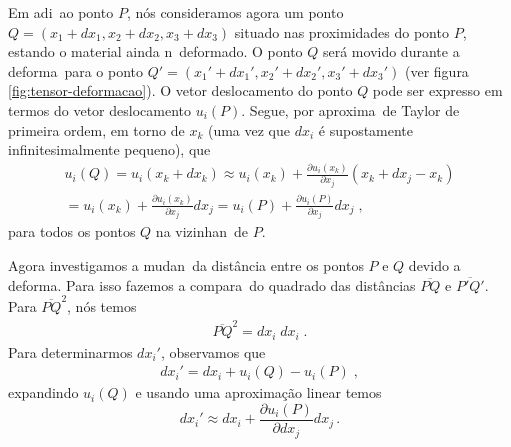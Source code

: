 Em adi\cao\ ao ponto $P$, n\'os consideramos agora um ponto
$Q=(x_1+dx_1,x_2+dx_2,x_3+dx_3)$ situado nas proximidades do
ponto $P$, estando o material ainda n\ao\ deformado. O
ponto $Q$ ser\'a movido durante a deforma\cao\ para o ponto
$Q'=(x_1'+dx_1',x_2'+dx_2',x_3'+dx_3')$ (ver figura \ref{fig:tensor-deformacao}). O vetor
deslocamento do ponto $Q$ pode ser expresso em termos do
vetor deslocamento $u_i(P)$. Segue, por aproxima\cao\ de Taylor de
primeira ordem, em torno de $x_k$ (uma vez que $dx_i$ \'e supostamente infinitesimalmente
pequeno), que
\begin{eqnarray} \label{vdq}
u_i(Q) = u_i(x_k+dx_k) \approx u_i(x_k) +
\frac{\partial u_i(x_k)}
{\partial x_j} (x_k + dx_j - x_k) \nonumber \\
 = u_i(x_k) +\frac{\partial u_i(x_k)}
{\partial x_j} dx_j = u_i(P) + \frac{\partial u_i(P)}
{\partial x_j} dx_j \; ,
\end{eqnarray}
para todos os pontos $Q$ na vizinhan\ca\ de $P$.


Agora investigamos a mudan\ca\ da dist\^ancia entre os pontos
$P$ e $Q$ devido a deforma\cao. Para isso fazemos a
compara\cao\ do quadrado das dist\^ancias $\overline{PQ}$
e $\overline{P'Q'}$.
Para $\overline{PQ}^2$, n\'os temos
\begin{eqnarray}
\overline{PQ}^2 = dx_i \; dx_i \; .
\end{eqnarray}
Para determinarmos $dx_i'$, observamos que
\begin{eqnarray}
dx_i' = dx_i + u_i(Q) - u_i(P)\; ,
\label{dxidxi}
\end{eqnarray}
expandindo $u_i(Q)$ e usando uma aproxima\c{c}\~ao linear temos
\begin{equation}
  dx_i' \approx dx_i + \frac{\partial u_i(P)}{\partial dx_j}dx_j \, .
\end{equation}



